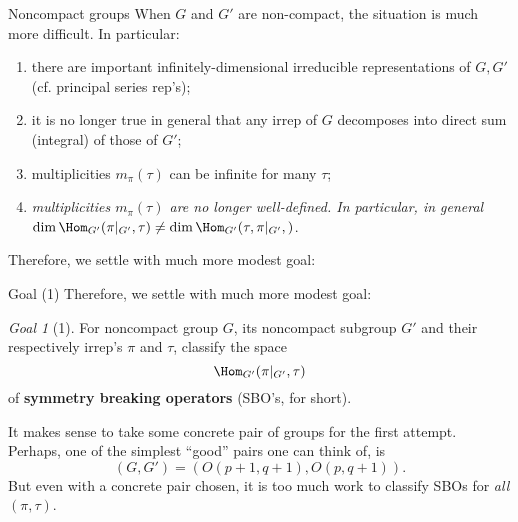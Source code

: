\documentclass[pdf]{beamer}
\theoremstyle{mystyle}
\theoremstyle{remark}
\newtheorem{goal}{Goal}[section]
\begin{document}
\begin{frame}{Noncompact groups}
	When $G$ and $G'$ are non-compact, the situation is much more difficult. In particular:\begin{enumerate}
		\item there are important infinitely-dimensional irreducible representations of $G,G'$ (cf. principal series rep's);
		\item it is no longer true in general that any irrep of $G$ decomposes into direct sum (integral) of those of $G'$;
		\item multiplicities $m_\pi(\tau)$ can be infinite for many $\tau$;
		\item {\it multiplicities $m_\pi(\tau)$ are no longer well-defined. In particular, in general $\dim\Hom_{G'}(\pi\kern-0.1cm\mid_{G'},\tau)\neq
			\dim\Hom_{G'}(\tau,\pi\kern-0.1cm\mid_{G'},)$}.
	\end{enumerate}
	Therefore, we settle with much more modest goal:
\end{frame}
\begin{frame}{Goal (1)}
	Therefore, we settle with much more modest goal:
	\begin{goal}[1]
		For noncompact group $G$, its noncompact subgroup $G'$ and their respectively irrep's $\pi$ and $\tau$, classify the space\begin{equation*}
			\Hom_{G'}(\pi\kern-0.1cm\mid_{G'},\tau)
		\end{equation*}
		of {\bf symmetry breaking operators} (SBO's, for short).
	\end{goal}
	It makes sense to take some concrete pair of groups for the first attempt. Perhaps, one of the simplest ``good'' pairs one can think of, is \begin{equation*}
		\left( G,G' \right)=(O(p+1,q+1),O(p,q+1)).
	\end{equation*}
	But even with a concrete pair chosen, it is too much work to classify SBOs for {\it all} $(\pi,\tau)$.
\end{frame}
\end{document}
